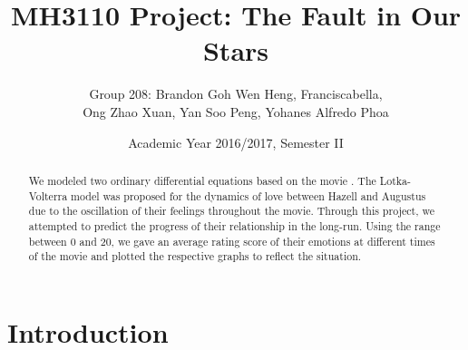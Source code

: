 \documentclass{article}
\title{MH3110 Project: The Fault in Our Stars}
\author{Group 208: Brandon Goh Wen Heng, Franciscabella, \\Ong Zhao Xuan, Yan Soo Peng, Yohanes Alfredo Phoa}
\date{Academic Year 2016/2017, Semester II}
\newcommand*\circled[1]{\tikz[baseline=(char.base)]{
            \node[shape=circle,draw,inner sep=2pt] (char) {#1};}}
\begin{document}
\maketitle

\begin{abstract}
{\par \noindent
We modeled two ordinary differential equations based on the  movie . The Lotka-Volterra model was proposed for the dynamics of love between Hazell and Augustus due to the oscillation of their feelings throughout the movie. Through this project, we attempted to predict the progress of their relationship in the long-run. Using the range between 0 and 20, we gave an average rating score of their emotions at different times of the movie and plotted the respective graphs to reflect the situation.}
\end{abstract}

\section*{\circled{1} Introduction}
\end{document}
